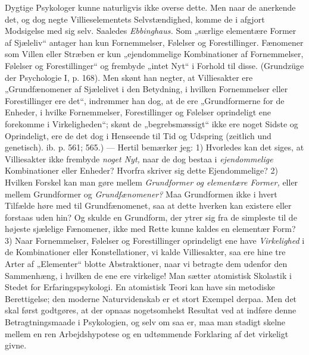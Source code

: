 \documentclass[12pt,a4paper,openany]{book}
\newcommand{\opage}[1]{\marginnote{\footnotesize\textit{[#1]}}}
\begin{document}
Dygtige Psykologer kunne naturligvis ikke overse dette.
Men naar de anerkende det, og dog negte Villieselementets
Selvstændighed, komme de i afgjort Modsigelse med sig selv.
Saaledes \textit{Ebbinghaus.} Som „særlige elementære Former af
Sjæleliv“ antager han kun Fornemmelser, Følelser og Forestillinger.
Fænomener som Villen eller Stræben er kun „ejendommelige
Kombinationer af Fornemmelser, Følelser og Forestillinger“
og frembyde „intet Nyt“ i Forhold til disse. (Grundzüge
der Psychologie I, p. 168). Men skønt han negter, at
Villiesakter ere „Grundfænomener af Sjælelivet i den Betydning,
i hvilken Fornemmelser eller Forestillinger ere det“, indrømmer
han dog, at de ere „Grundformerne for de Enheder, i hvilke
Fornemmelser, Forestillinger og Følelser oprindeligt ene forekomme
i Virkeligheden“; skønt de „begrebsmæssigt“ ikke ere
noget Sidste og Oprindeligt, ere de det dog i Henseende til
Tid og Udspring (zeitlich und genetisch). ib. p. 561; 565.)
--- Hertil bemærker jeg: 1) Hvorledes kan det siges, at Villiesakter
ikke frembyde \textit{noget Nyt,} naar de dog bestaa i \textit{ejendommelige}
Kombinationer eller Enheder? Hvorfra skriver sig dette
Ejendommelige? 2) Hvilken Forskel kan man gøre mellem
\textit{Grundformer og elementære Former,} eller mellem Grundformer
og \textit{Grundfænomener?} Maa Grundformen ikke i hvert Tilfælde
høre med til Grundfænomenet, saa at dette hverken kan existere
eller forstaas uden hin? Og skulde en Grundform, der
ytrer sig fra de simpleste til de højeste sjælelige Fænomener,
ikke med Rette kunne kaldes en elementær Form? 3) Naar
Fornemmelser, Følelser og Forestillinger oprindeligt ene have
\textit{Virkelighed} i de Kombinationer eller Konstellationer, vi kalde
Villiesakter, saa ere hine tre Arter af „Elementer“ blotte Abstraktioner,
naar vi betragte dem udenfor den Sammenhæng, i
hvilken de ene ere virkelige! Man sætter atomistisk Skolastik
i Stedet for Erfaringspsykologi. En atomistisk Teori kan have
sin metodiske Berettigelse; den moderne Naturvidenskab er et
stort Exempel derpaa. Men det skal først godtgøres, at der
\setcounter{footnote}{0}%
\opage{32}opnaas nogetsomhelst Resultat ved at indføre denne Betragtningsmaade
i Psykologien, og selv om saa er, maa man stadigt
skelne mellem en ren Arbejdshypotese og en udtømmende Forklaring
af det virkeligt givne.
\end{document}
